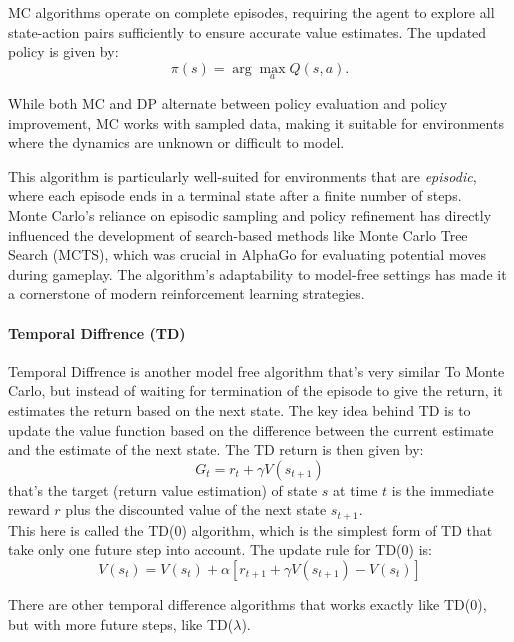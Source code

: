 MC algorithms operate on complete episodes, requiring the agent to explore all
state-action pairs sufficiently to ensure accurate value estimates. The updated
policy is given by:
\begin{equation}
    \pi(s) = \arg\max_a Q(s, a).
\end{equation}

While both MC and DP alternate between policy evaluation and policy
improvement, MC works with sampled data, making it suitable for environments
where the dynamics are unknown or difficult to model.

This algorithm is particularly well-suited for environments that are
\emph{episodic}, where each episode ends in a terminal state after a finite
number of steps. \\ Monte Carlo's reliance on episodic sampling and policy
refinement has directly influenced the development of search-based methods like
Monte Carlo Tree Search (MCTS), which was crucial in AlphaGo for evaluating
potential moves during gameplay. The algorithm's adaptability to model-free
settings has made it a cornerstone of modern reinforcement learning strategies.

\paragraph{Temporal Diffrence (TD)}

Temporal Diffrence is another model free algorithm that's very similar To Monte
Carlo, but instead of waiting for termination of the episode to give the
return, it estimates the return based on the next state. The key idea behind TD
is to update the value function based on the difference between the current
estimate and the estimate of the next state. The TD return is then given by:
\begin{equation}
    G_t = r_t + \gamma V(s_{t+1})
\end{equation}
that's the target (return value estimation) of state $s$ at time $t$ is the immediate reward $r$ plus the
discounted value of the next state $s_{t+1}$.\\
This here is called the TD(0) algorithm, which is the simplest form of TD
that take only one future step into account. The update rule for TD(0) is:
\begin{equation}
    V(s_t) = V(s_t) + \alpha [r_{t+1} + \gamma V(s_{t+1}) - V(s_t)]
\end{equation}

There are other temporal difference algorithms that works exactly like TD(0),
but with more future steps, like TD($\lambda$). \\

